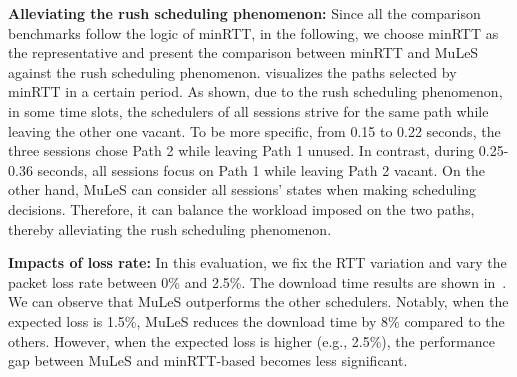 \noindent \textbf{Alleviating the rush scheduling phenomenon:} Since all the comparison benchmarks follow the logic of minRTT, in the following, we choose minRTT as the representative and present the comparison between minRTT and MuLeS against the rush scheduling phenomenon.  visualizes the paths selected by minRTT in a certain period.
As shown, due to the rush scheduling phenomenon, in some time slots, the schedulers of all sessions strive for the same path while leaving the other one vacant. To be more specific, from 0.15 to 0.22 seconds, the three sessions chose Path 2 while leaving Path 1 unused. In contrast, during 0.25-0.36 seconds, all sessions focus on Path 1 while leaving Path 2 vacant. On the other hand, MuLeS can consider all sessions' states when making scheduling decisions. Therefore, it can balance the workload imposed on the two paths, thereby alleviating the rush scheduling phenomenon.

\noindent \textbf{Impacts of loss rate:} In this evaluation, we fix the RTT variation and vary the packet loss rate between 0\% and 2.5\%. The download time results are shown in~. We can observe that MuLeS outperforms the other schedulers. Notably, when the expected loss is 1.5\%, MuLeS reduces the download time by 8\% compared to the others. However, when the expected loss is higher (e.g., 2.5\%), the performance gap between MuLeS and minRTT-based becomes less significant. 


